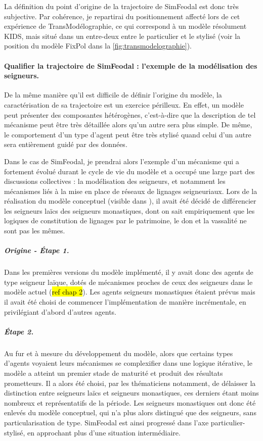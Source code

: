 La définition du point d'origine de la trajectoire de SimFeodal est donc très subjective.
Par cohérence, je repartirai du positionnement affecté lors de cet expérience de \og TransModélographie\fg{}, ce qui correspond à un modèle résolument KIDS, mais situé dans un entre-deux entre le particulier et le stylisé (voir la position du modèle FixPol dans la \cref{fig:transmodelographie}). 

\paragraph{Qualifier la trajectoire de SimFeodal : l'exemple de la modélisation des seigneurs.}

De la même manière qu'il est difficile de définir l'origine du modèle, la caractérisation de sa trajectoire est un exercice périlleux.
En effet, un modèle peut présenter des composantes hétérogènes, c'est-à-dire que la description de tel mécanisme peut être très détaillée alors qu'un autre sera plus simple.
De même, le comportement d'un type d'agent peut être très stylisé quand celui d'un autre sera entièrement guidé par des données.

Dans le cas de SimFeodal, je prendrai alors l'exemple d'un mécanisme qui a fortement évolué durant le cycle de vie du modèle et a occupé une large part des discussions collectives : la modélisation des seigneurs, et notamment les mécanismes liés à la mise en place de réseaux de lignages seigneuriaux.
Lors de la réalisation du modèle conceptuel (visible dans \textcite[fig. 13.1, p. 297]{tannier_ontologie_2014}), il avait été décidé de différencier les seigneurs laïcs des seigneurs monastiques, dont on sait empiriquement que les logiques de constitution de lignages par le patrimoine, le don et la vassalité ne sont pas les mêmes.

\subparagraph{Origine - Étape 1.}Dans les premières versions du modèle implémenté, il y avait donc des agents de type \og seigneur laïque\fg{}, dotés de mécanismes proches de ceux des \og seigneurs\fg{} dans le modèle actuel (\hl{ref chap 2}).
Les agents \og seigneurs monastiques\fg{} étaient prévus mais il avait été choisi de commencer l'implémentation de manière incrémentale, en privilégiant d'abord d'autres agents.

\subparagraph{Étape 2.}Au fur et à mesure du développement du modèle, alors que certains types d'agents voyaient leurs mécanismes se complexifier dans une logique itérative, le modèle a atteint un premier stade de maturité et produit des résultats prometteurs.
Il a alors été choisi, par les thématiciens notamment, de délaisser la distinction entre seigneurs laïcs et seigneurs monastiques, ces derniers étant moins nombreux et représentatifs de la période.
Les seigneurs monastiques ont donc été enlevés du modèle conceptuel, qui n'a plus alors distingué que des \og seigneurs\fg{}, sans particularisation de type.
SimFeodal est ainsi progressé dans l'axe particulier-stylisé, en approchant plus d'une situation intermédiaire.

